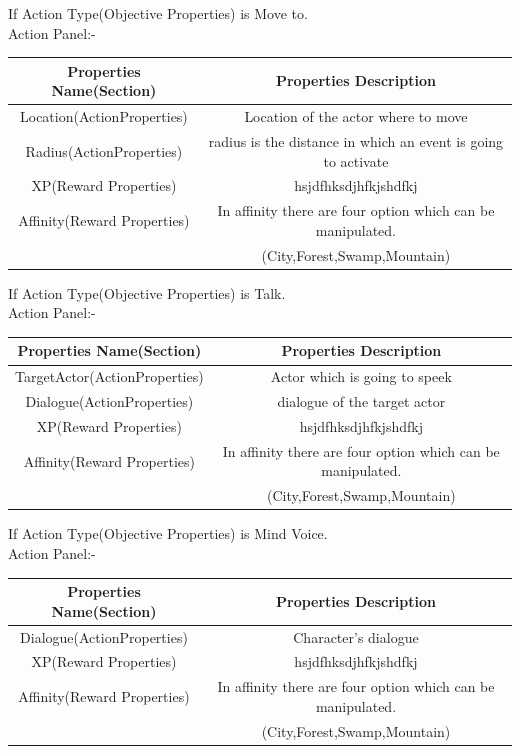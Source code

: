 \documentclass[12pt]{article}
\begin{document}
	  If Action Type(Objective Properties) is Move to.\\
	  Action Panel:-
	  \begin{center}
	  	\begin{tabular}{|c|c|}\hline
	  	Properties Name(Section)& Properties Description\\\hline\hline
	  	Location(ActionProperties) & Location of the actor where to move\\\hline
	  	Radius(ActionProperties) & radius is the distance in which an event is going to activate\\\hline
	  		  	XP(Reward Properties)& hsjdfhksdjhfkjshdfkj\\\hline
	  	Affinity(Reward Properties)& In affinity there are four option which can be manipulated.\\
	  	& (City,Forest,Swamp,Mountain)\\\hline
	  	\end{tabular}
	  \end{center}
	  \pagebreak
	    If Action Type(Objective Properties) is Talk.\\
	  Action Panel:-
	  \begin{center}
	  	\begin{tabular}{|c|c|}\hline
	  	Properties Name(Section)& Properties Description\\\hline\hline
	  	TargetActor(ActionProperties) & Actor which is going to speek\\\hline
	  	Dialogue(ActionProperties) & dialogue of the target actor\\\hline
	  		  	XP(Reward Properties)& hsjdfhksdjhfkjshdfkj\\\hline
	  	Affinity(Reward Properties)& In affinity there are four option which can be manipulated.\\
	  	& (City,Forest,Swamp,Mountain)\\\hline
	  	\end{tabular}
	  \end{center}
	    If Action Type(Objective Properties) is Mind Voice.\\
	  Action Panel:-
	  \begin{center}
	  	\begin{tabular}{|c|c|}\hline
	  	Properties Name(Section)& Properties Description\\\hline\hline
	  	Dialogue(ActionProperties) & Character's dialogue\\\hline
	  		  	XP(Reward Properties)& hsjdfhksdjhfkjshdfkj\\\hline
	  	Affinity(Reward Properties)& In affinity there are four option which can be manipulated.\\
	  	& (City,Forest,Swamp,Mountain)\\\hline
	  	\end{tabular}
	  \end{center}
	  \pagebreak
\end{document}
